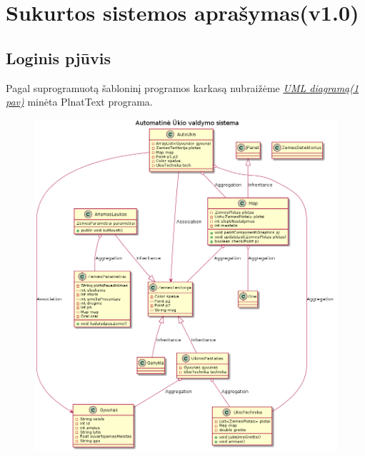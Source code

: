 \documentclass[oneside]{VUMIFPSkursinis}
\begin{document}
\section{Sukurtos sistemos aprašymas(v1.0)}

\subsection{Loginis pjūvis}
Pagal suprogramuotą šabloninį programos karkasą nubraižėme  \hyperref[fig:uml]{\textit{ UML diagramą(1 pav)}} minėta PlnatText programa.
	\begin{figure}[H]	
	\centering	
		\includegraphics[width=\textwidth,height=\textheight,keepaspectratio]{uml.png}	
		\caption{}
		\label{fig:uml}
	\end{figure}
\end{document}
